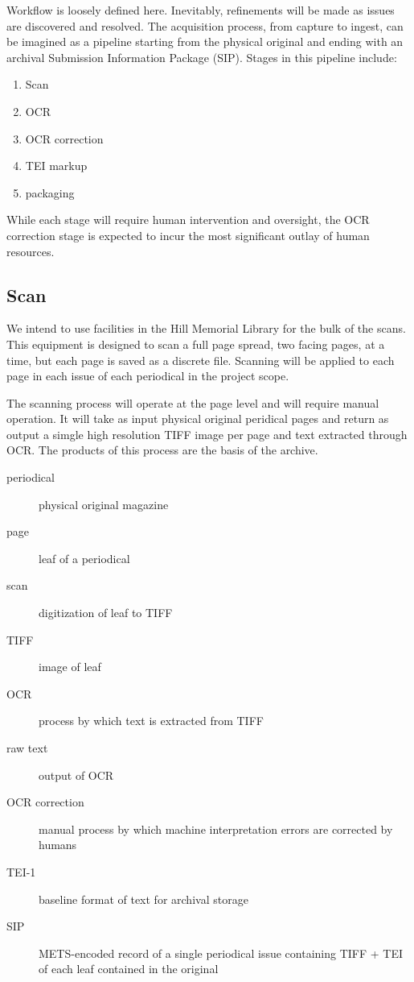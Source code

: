 Workflow is loosely defined here. Inevitably, refinements will be made as issues are discovered and resolved. The acquisition process, from capture to ingest, can be imagined as a pipeline starting from the physical original and ending with an archival Submission Information Package (SIP). Stages in this pipeline include: 
\begin{enumerate}
  \item{Scan}
  \item{OCR}
  \item{OCR correction}
  \item{TEI markup}
  \item{packaging}
\end{enumerate}
While each stage will require human intervention and oversight, the OCR correction stage is expected to incur the most significant outlay of human resources. 
\subsection{Scan}
We intend to use facilities in the Hill Memorial Library for the bulk of the scans. This equipment is designed to scan a full page spread, two facing pages, at a time, but each page is saved as a discrete file. Scanning will be applied to each page in each issue of each periodical in the project scope.



The scanning process will operate at the page level and will require manual operation. It will take as input physical original peridical pages and return as output a simgle high resolution TIFF image per page and text extracted through OCR. The products of this process are the basis of the archive.
\begin{description}
  \item[periodical]{physical original magazine}
  \item[page]{leaf of a periodical}
  \item[scan]{digitization of leaf to TIFF}
  \item[TIFF]{image of leaf}
  \item[OCR]{process by which text is extracted from TIFF}
  \item[raw text]{output of OCR}
  \item[OCR correction]{manual process by which machine interpretation errors are corrected by humans}
  \item[TEI-1]{baseline format of text for archival storage}
  \item[SIP]{METS-encoded record of a single periodical issue containing TIFF + TEI of each leaf contained in the original}
\end{description}

